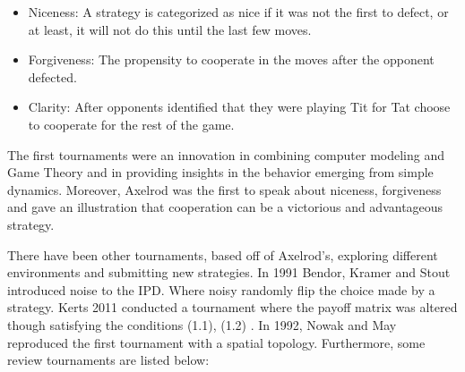 \begin{itemize}
  \item Niceness:  A strategy is categorized as nice if it was not the
                    first to defect, or at least, it will not do this until
                    the last few moves.
  \item Forgiveness: The propensity to cooperate in the moves after the
                     opponent defected.
  \item Clarity: After opponents identified that they were playing Tit for Tat
                 choose to cooperate for the rest of the game.
\end{itemize}

The first tournaments were an innovation in combining computer modeling and Game
Theory and in providing insights in the behavior emerging from simple dynamics.
Moreover, Axelrod was the first to speak about niceness, forgiveness and gave an
illustration that cooperation can be a victorious and advantageous strategy.

There have been other tournaments, based off of Axelrod’s, exploring different
environments and submitting new strategies. In 1991 Bendor, Kramer and Stout
introduced noise to the IPD. Where noisy randomly flip the choice made by a
strategy.  Kerts 2011 conducted a tournament where the payoff matrix was altered
though satisfying the conditions (1.1), (1.2) . In 1992, Nowak and May
reproduced the first tournament with a spatial topology.
Furthermore, some review tournaments are listed below:


